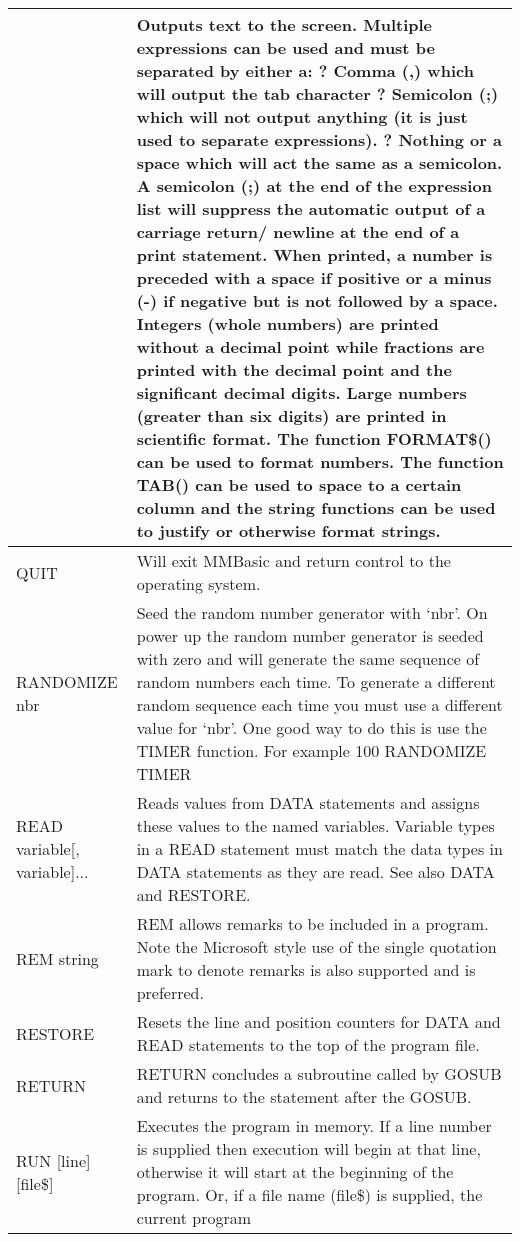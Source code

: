 \documentclass[11pt,fleqn]{book} %
\numberwithin{equation}{section} %
\numberwithin{figure}{section} %
\numberwithin{table}{section} %
\begin{document}
\begin{table}[]
\begin{tabular}{|p{4cm}|p{10cm}|}
& Outputs text to the screen. Multiple expressions can be used and must be
separated by either a:
? Comma (,) which will output the tab character
? Semicolon (;) which will not output anything (it is just used to
separate expressions).
? Nothing or a space which will act the same as a semicolon.
A semicolon (;) at the end of the expression list will suppress the
automatic output of a carriage return/ newline at the end of a print
statement.
When printed, a number is preceded with a space if positive or a minus
(-) if negative but is not followed by a space. Integers (whole numbers)
are printed without a decimal point while fractions are printed with the
decimal point and the significant decimal digits. Large numbers (greater
than six digits) are printed in scientific format.
The function FORMAT\$() can be used to format numbers. The function
TAB() can be used to space to a certain column and the string functions
can be used to justify or otherwise format strings.
\\ \hline
QUIT & Will exit MMBasic and return control to the operating system.
\\ \hline
RANDOMIZE nbr & Seed the random number generator with ‘nbr’.
On power up the random number generator is seeded with zero and will
generate the same sequence of random numbers each time. To generate
a different random sequence each time you must use a different value for
‘nbr’. One good way to do this is use the TIMER function.
For example  100 RANDOMIZE TIMER
\\ \hline
READ variable[, variable]...
& Reads values from DATA statements and assigns these values to the
named variables. Variable types in a READ statement must match the
data types in DATA statements as they are read. See also DATA and
RESTORE.
\\ \hline
REM string & REM allows remarks to be included in a program.
Note the Microsoft style use of the single quotation mark to denote
remarks is also supported and is preferred.
\\ \hline
RESTORE & Resets the line and position counters for DATA and READ statements to
the top of the program file.
\\ \hline
RETURN & RETURN concludes a subroutine called by GOSUB and returns to the
statement after the GOSUB.
\\ \hline
RUN [line] [file\$] & Executes the program in memory. If a line number is supplied then
execution will begin at that line, otherwise it will start at the beginning
of the program. Or, if a file name (file\$) is supplied, the current program

\end{tabular}
\end{table}
\end{document}
